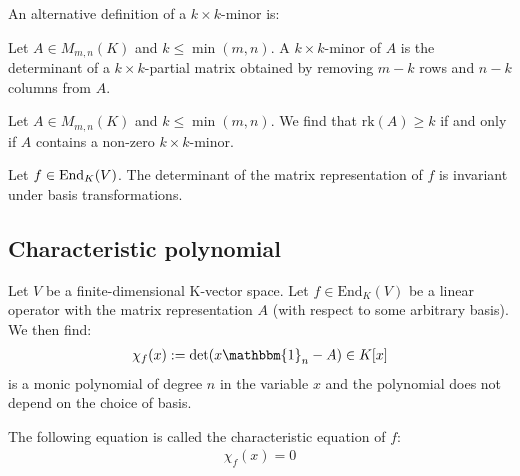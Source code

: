         An alternative definition of a $k\times k$-minor is: 
        \begin{definition}
		Let $A\in M_{m,n}(K)$ and $k\leq\min(m, n)$. A $k\times k$-minor of $A$ is the determinant of a $k\times k$-partial matrix obtained by removing $m-k$ rows and $n-k$ columns from $A$.
	\end{definition}
        \begin{theorem}
		Let $A\in M_{m,n}(K)$ and $k\leq\min(m, n)$. We find that $\text{rk}(A)\geq k$ if and only if $A$ contains a non-zero $k\times k$-minor.
	\end{theorem}
        
        \begin{theorem}
		Let $f\in\textup{End}_K(V)$. The determinant of the matrix representation of $f$ is invariant under basis transformations.
	\end{theorem}
	

\subsection{Characteristic polynomial}

    	\begin{definition}\label{linalgebra:characteristic_polynomial}
		Let $V$ be a finite-dimensional K-vector space. Let $f\in \text{End}_K(V)$ be a linear operator with the matrix representation $A$ (with respect to some arbitrary basis). We then find:
		\begin{gather}
                	\chi_f(x) := \det(x\mathbbm{1}_n - A) \in K[x]
		\end{gather}
		is a monic polynomial of degree $n$ in the variable $x$ and the polynomial does not depend on the choice of basis.
	\end{definition}
        
        \begin{definition}
		The following equation is called the characteristic equation of $f$:
	        \begin{gather}
            		\label{linalgebra:characteristic_equation}
			\boxed{\chi_f(x) = 0}
		\end{gather}
	\end{definition}
        

